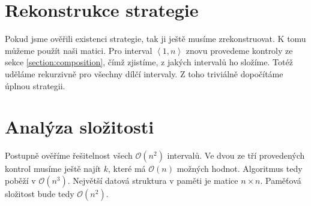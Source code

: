 \documentclass{article}
\begin{document}
\section{Rekonstrukce strategie}

Pokud jsme ověřili existenci strategie, tak ji ještě musíme zrekonstruovat. K tomu můžeme použít naši matici. Pro interval $\left<1, n\right>$ znovu provedeme kontroly ze sekce \ref{section:composition}, čímž zjistíme, z jakých intervalů ho složíme. Totéž uděláme rekurzivně pro všechny dílčí intervaly. Z toho triviálně dopočítáme úplnou strategii.

\section{Analýza složitosti}
\label{section:analysis}

Postupně ověříme řešitelnost všech $\mathcal{O}\left(n^2\right)$ intervalů. Ve dvou ze tří provedených kontrol musíme ještě najít $k$, které má $\mathcal{O}\left(n\right)$ možných hodnot. Algoritmus tedy poběží v $\mathcal{O}\left(n^3\right)$. Největší datová struktura v paměti je matice $n \times n$. Paměťová složitost bude tedy $\mathcal{O}\left(n^2\right)$.
\end{document}
